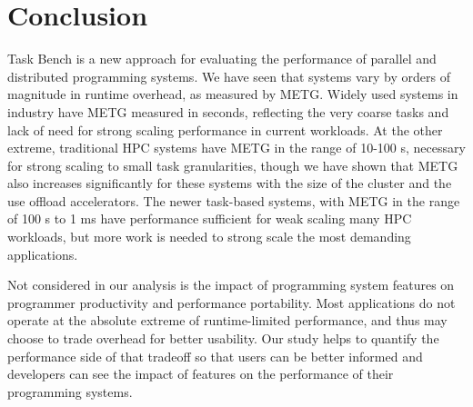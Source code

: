 \section{Conclusion}
\label{sec:conclusion}

Task Bench is a new approach for evaluating the performance
of parallel and distributed programming systems. We have seen that
systems vary by orders of magnitude in runtime overhead, as measured
by METG. Widely used systems in industry have METG measured in
seconds, reflecting the very coarse tasks and lack of need for strong
scaling performance in current workloads. At the other extreme,
traditional HPC systems have METG in the range of 10-100 \textmu{}s,
necessary for strong scaling to small task granularities, though we
have shown that METG also increases significantly for these systems
with the size of the cluster and the use offload accelerators. The newer
task-based systems, with METG in the range of 100 \textmu{}s to 1 ms
have performance sufficient for weak scaling many HPC workloads, but
more work is needed to strong scale the most demanding applications.

Not considered in our analysis is the impact of programming system
features on programmer productivity and performance portability. Most
applications do not operate at the absolute extreme of runtime-limited
performance, and thus may choose to trade overhead for better
usability. Our study helps to quantify the performance side of that
tradeoff so that users can be better informed and developers can see
the impact of features on the performance of their programming
systems.
